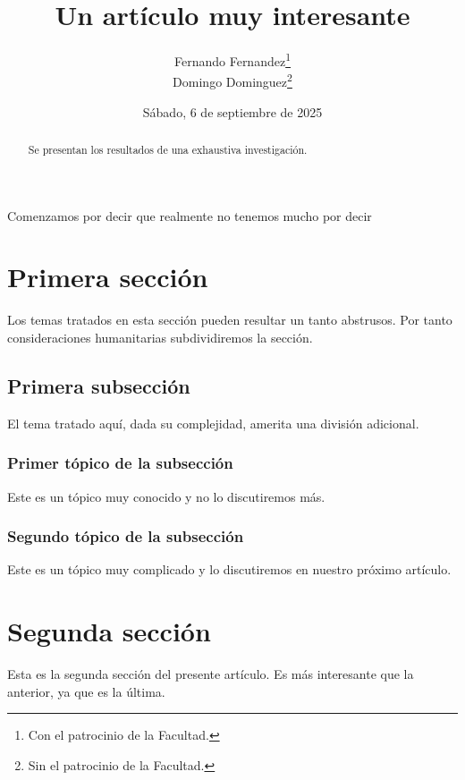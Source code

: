 \documentclass[10pt]{article}
\title{Un artículo muy interesante}
\author{Fernando Fernandez\thanks{Con el patrocinio de la Facultad.}\\
	Domingo Dominguez\thanks{Sin el patrocinio de la Facultad.}}
\date{Sábado, 6 de septiembre de 2025}
\begin{document}
\maketitle

\begin{abstract}
	Se presentan los resultados de una exhaustiva investigación.
\end{abstract}

Comenzamos por decir que realmente no tenemos mucho por decir

\section{Primera sección}
Los temas tratados en esta sección pueden resultar un tanto abstrusos.
Por tanto consideraciones humanitarias subdividiremos la sección.

\subsection{Primera subsección}
El tema tratado aquí, dada su complejidad, amerita una
división adicional.

\subsubsection{Primer tópico de la subsección}
Este es un tópico muy conocido y no lo discutiremos más.

\subsubsection{Segundo tópico de la subsección}
Este es un tópico muy complicado y lo discutiremos en nuestro
próximo artículo.

\section{Segunda sección}
Esta es la segunda sección del presente artículo.
Es más interesante que la anterior, ya que es la última.
\end{document}
